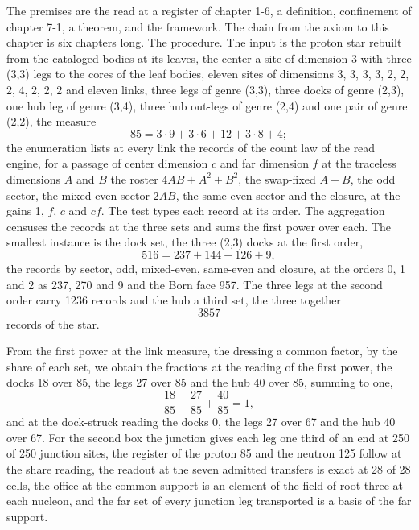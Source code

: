 \begin{chproof}
The premises are the read at a register of chapter 1-6, a definition, confinement of chapter 7-1, a theorem, and the framework. The chain from the axiom to this chapter is six chapters long. The procedure. The input is the proton star rebuilt from the cataloged bodies at its leaves, the center a site of dimension 3 with three (3,3) legs to the cores of the leaf bodies, eleven sites of dimensions 3, 3, 3, 3, 2, 2, 2, 4, 2, 2, 2 and eleven links, three legs of genre (3,3), three docks of genre (2,3), one hub leg of genre (3,4), three hub out-legs of genre (2,4) and one pair of genre (2,2), the measure
\begin{equation}
85 = 3 \cdot 9 + 3 \cdot 6 + 12 + 3 \cdot 8 + 4 ;
\end{equation}
the enumeration lists at every link the records of the count law of the read engine, for a passage of center dimension $c$ and far dimension $f$ at the traceless dimensions $A$ and $B$ the roster $4AB + A^{2} + B^{2}$, the swap-fixed $A + B$, the odd sector, the mixed-even sector $2AB$, the same-even sector and the closure, at the gains 1, $f$, $c$ and $cf$. The test types each record at its order. The aggregation censuses the records at the three sets and sums the first power over each. The smallest instance is the dock set, the three (2,3) docks at the first order,
\begin{equation}
516 = 237 + 144 + 126 + 9 ,
\end{equation}
the records by sector, odd, mixed-even, same-even and closure, at the orders 0, 1 and 2 as 237, 270 and 9 and the Born face 957. The three legs at the second order carry 1236 records and the hub a third set, the three together
\begin{equation}
3857
\end{equation}
records of the star.

From the first power at the link measure, the dressing a common factor, by the share of each set, we obtain the fractions at the reading of the first power, the docks 18 over 85, the legs 27 over 85 and the hub 40 over 85, summing to one,
\begin{equation}
\frac{18}{85} + \frac{27}{85} + \frac{40}{85} = 1 ,
\end{equation}
and at the dock-struck reading the docks 0, the legs 27 over 67 and the hub 40 over 67. For the second box the junction gives each leg one third of an end at 250 of 250 junction sites, the register of the proton 85 and the neutron 125 follow at the share reading, the readout at the seven admitted transfers is exact at 28 of 28 cells, the office at the common support is an element of the field of root three at each nucleon, and the far set of every junction leg transported is a basis of the far support.


\end{chproof}
